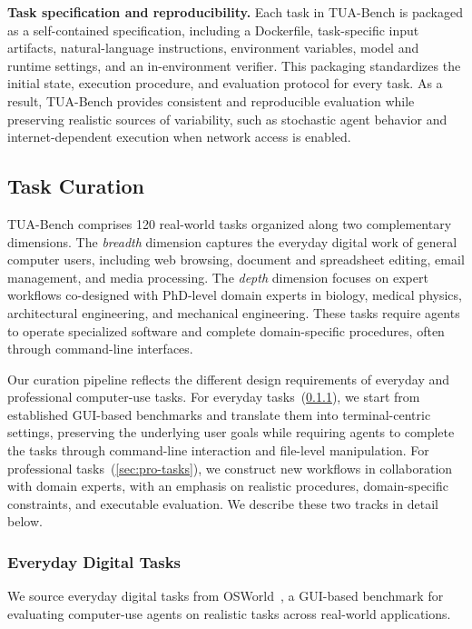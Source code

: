 \documentclass{llmxive}
\providecommand{\benchname}{\mbox{TUA-Bench}\xspace}
\begin{document}
\noindent\textbf{Task specification and reproducibility.}
Each task in \benchname is packaged as a self-contained specification, including a Dockerfile, task-specific input artifacts, natural-language instructions, environment variables, model and runtime settings, and an in-environment verifier. This packaging standardizes the initial state, execution procedure, and evaluation protocol for every task. As a result, \benchname provides consistent and reproducible evaluation while preserving realistic sources of variability, such as stochastic agent behavior and internet-dependent execution when network access is enabled.


\subsection{Task Curation}\label{sec:task-curation}
TUA-Bench comprises 120 real-world tasks organized along two complementary dimensions. The \emph{breadth} dimension captures the everyday digital work of general computer users, including web browsing, document and spreadsheet editing, email management, and media processing. The \emph{depth} dimension focuses on expert workflows co-designed with PhD-level domain experts in biology, medical physics, architectural engineering, and mechanical engineering. These tasks require agents to operate specialized software and complete domain-specific procedures, often through command-line interfaces.

Our curation pipeline reflects the different design requirements of everyday and professional computer-use tasks. For everyday tasks~(\cref{sec:everyday-task}), we start from established GUI-based benchmarks and translate them into terminal-centric settings, preserving the underlying user goals while requiring agents to complete the tasks through command-line interaction and file-level manipulation. For professional tasks~(\cref{sec:pro-tasks}), we construct new workflows in collaboration with domain experts, with an emphasis on realistic procedures, domain-specific constraints, and executable evaluation. We describe these two tracks in detail below.


\subsubsection{Everyday Digital Tasks}\label{sec:everyday-task}
We source everyday digital tasks from OSWorld~\citep{xie2024osworld}, a GUI-based benchmark for evaluating computer-use agents on realistic tasks across real-world applications.
\end{document}
